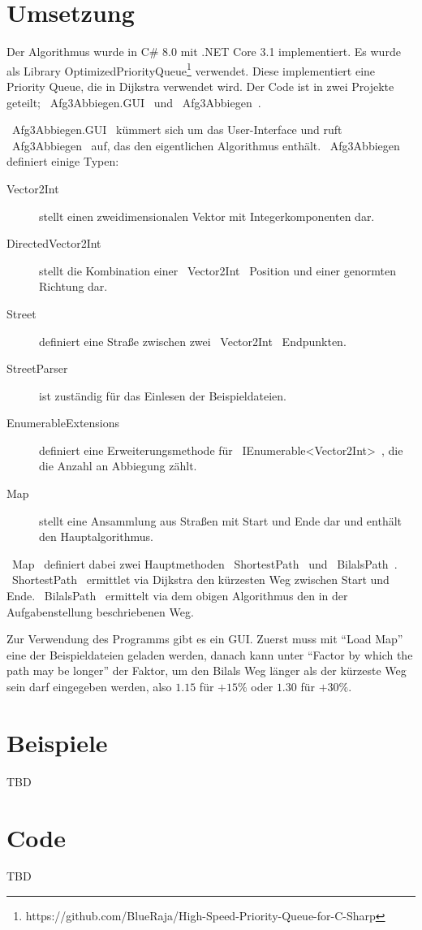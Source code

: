 \documentclass{article}
\theoremstyle{nonumberplain}
\begin{document}
\section{Umsetzung}

Der Algorithmus wurde in C\# 8.0 mit .NET Core 3.1 implementiert.
Es wurde als Library OptimizedPriorityQueue\footnote{https://github.com/BlueRaja/High-Speed-Priority-Queue-for-C-Sharp} verwendet. Diese implementiert eine Priority Queue, die in Dijkstra verwendet wird.
Der Code ist in zwei Projekte geteilt;
~Afg3Abbiegen.GUI~ und ~Afg3Abbiegen~.

~Afg3Abbiegen.GUI~ kümmert sich um das User-Interface und ruft ~Afg3Abbiegen~ auf, das den eigentlichen Algorithmus enthält.
~Afg3Abbiegen~ definiert einige Typen:

\begin{description}
    \item[Vector2Int] stellt einen zweidimensionalen Vektor mit Integerkomponenten dar.
    \item[DirectedVector2Int] stellt die Kombination einer ~Vector2Int~ Position und einer genormten Richtung dar.
    \item[Street] definiert eine Straße zwischen zwei ~Vector2Int~ Endpunkten.
    \item[StreetParser] ist zuständig für das Einlesen der Beispieldateien.
    \item[EnumerableExtensions] definiert eine Erweiterungsmethode für ~IEnumerable<Vector2Int>~, die die Anzahl an Abbiegung zählt.
    \item[Map] stellt eine Ansammlung aus Straßen mit Start und Ende dar und enthält den Hauptalgorithmus. 
\end{description}

~Map~ definiert dabei zwei Hauptmethoden
~ShortestPath~ und ~BilalsPath~.
~ShortestPath~ ermittlet via Dijkstra den kürzesten Weg zwischen Start und Ende.
~BilalsPath~ ermittelt via dem obigen Algorithmus den in der Aufgabenstellung beschriebenen Weg.

Zur Verwendung des Programms gibt es ein GUI.
Zuerst muss mit ``Load Map'' eine der Beispieldateien geladen werden, danach kann unter ``Factor by which the path may be longer'' der Faktor, um den Bilals Weg länger als der kürzeste Weg sein darf eingegeben werden, also \(1.15\) für \(+15\%\) oder \(1.30\) für \(+30\%\).

\section{Beispiele}

TBD

\section{Code}

TBD
\end{document}
